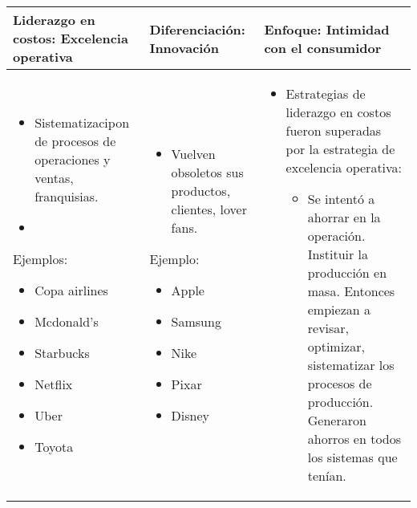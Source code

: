 \begin{center}
    \begin{tabular}{ | p{5.8cm} | p{5.8cm} | p{5.8cm} |}
        \hline
            Liderazgo en costos: Excelencia operativa & Diferenciación: Innovación & Enfoque: Intimidad con el consumidor \\ 
        \hline
            \begin{itemize}
                \item Sistematizacipon de procesos de operaciones y ventas, franquisias.
                \item 
            \end{itemize}
            Ejemplos:
                \begin{itemize}
                    \item Copa airlines 
                    \item Mcdonald's 
                    \item Starbucks 
                    \item Netflix 
                    \item Uber 
                    \item Toyota 
                \end{itemize}
            & 
            \begin{itemize}
                \item Vuelven obsoletos sus productos, clientes, lover fans.
            \end{itemize}
            Ejemplo:
                \begin{itemize}
                    \item Apple 
                    \item Samsung 
                    \item Nike 
                    \item Pixar 
                    \item Disney 
                \end{itemize}
            & 
            \begin{itemize}
                \item Estrategias de liderazgo en costos fueron superadas por la estrategia de excelencia operativa:
                    \begin{itemize}
                        \item Se intentó a ahorrar en la operación. Instituir la producción en masa. Entonces empiezan a revisar, optimizar, sistematizar los procesos de producción. Generaron ahorros en todos los sistemas que tenían.

\end{itemize}
\end{itemize}
\end{tabular}
\end{center}
